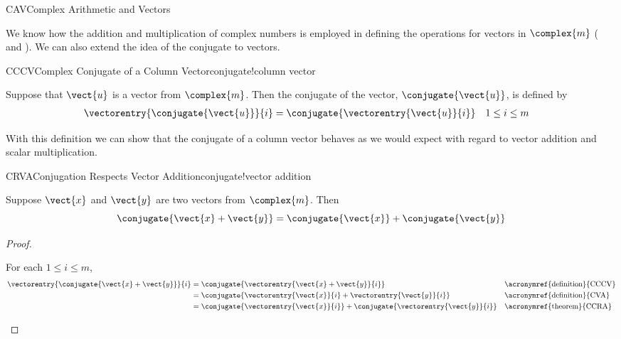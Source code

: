 \begin{subsect}{CAV}{Complex Arithmetic and Vectors}
%
\begin{para}We know how the addition and multiplication of complex numbers is employed in defining the operations for vectors in $\complex{m}$ ( and ).  We can also extend the idea of the conjugate to vectors.\end{para}
%
\begin{definition}{CCCV}{Complex Conjugate of a Column Vector}{conjugate!column vector}
\begin{para}Suppose that $\vect{u}$ is a vector from $\complex{m}$.  Then the conjugate of the vector, $\conjugate{\vect{u}}$, is defined by
%
\begin{align*}
\vectorentry{\conjugate{\vect{u}}}{i}
&=\conjugate{\vectorentry{\vect{u}}{i}}
&&\text{$1\leq i\leq m$}
\end{align*}
\end{para}
%
\end{definition}
%
\begin{para}With this definition we can show that the conjugate of a column vector behaves as we would expect with regard to vector addition and scalar multiplication.\end{para}
%
\begin{theorem}{CRVA}{Conjugation Respects Vector Addition}{conjugate!vector addition}
\begin{para}Suppose $\vect{x}$ and $\vect{y}$ are two vectors from $\complex{m}$.  Then
%
\begin{equation*}
\conjugate{\vect{x}+\vect{y}}=\conjugate{\vect{x}}+\conjugate{\vect{y}}
\end{equation*}
\end{para}
%
\end{theorem}
%
\begin{proof}
%
\begin{para}For each $1\leq i\leq m$,
%
\begin{align*}
\vectorentry{\conjugate{\vect{x}+\vect{y}}}{i}
&=\conjugate{\vectorentry{\vect{x}+\vect{y}}{i}}&&\text{\acronymref{definition}{CCCV}}\\
&=\conjugate{\vectorentry{\vect{x}}{i}+\vectorentry{\vect{y}}{i}}&&\text{\acronymref{definition}{CVA}}\\
&=\conjugate{\vectorentry{\vect{x}}{i}}+\conjugate{\vectorentry{\vect{y}}{i}}&&\text{\acronymref{theorem}{CCRA}}\\

\end{align*}
\end{para}
\end{proof}
\end{subsect}
